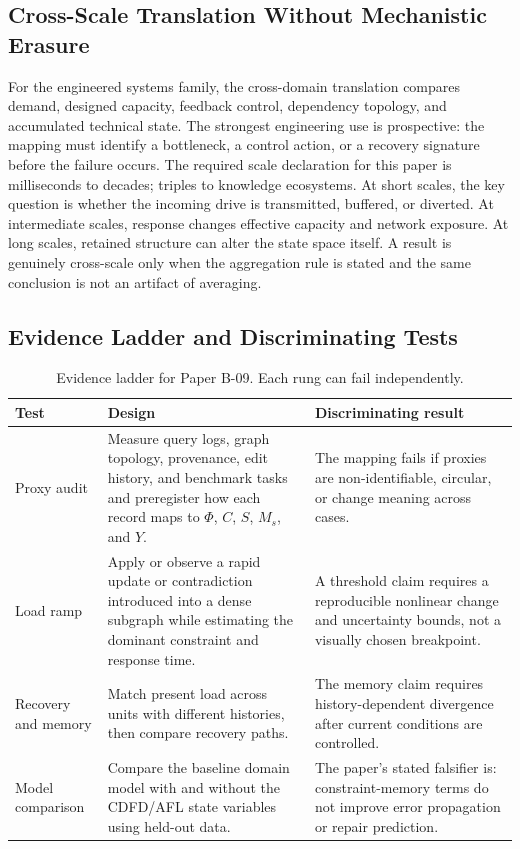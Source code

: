 \documentclass[11pt,a4paper]{article}
\begin{document}
\subsection{Cross-Scale Translation Without Mechanistic Erasure}

For the engineered systems family, the cross-domain translation compares demand, designed capacity, feedback control, dependency topology, and accumulated technical state. The strongest engineering use is prospective: the mapping must identify a bottleneck, a control action, or a recovery signature before the failure occurs. \cite{BarabasiAlbert1999,WattsStrogatz1998,Shannon1948,BakTangWiesenfeld1987}
The required scale declaration for this paper is milliseconds to decades; triples to knowledge ecosystems. At short
scales, the key question is whether the incoming drive is transmitted,
buffered, or diverted. At intermediate scales, response changes effective
capacity and network exposure. At long scales, retained structure can alter the
state space itself. A result is genuinely cross-scale only when the aggregation
rule is stated and the same conclusion is not an artifact of averaging.

\subsection{Evidence Ladder and Discriminating Tests}

\begin{table}[htbp]
\centering
\small
\caption{Evidence ladder for Paper B-09. Each rung can fail independently.}
\begin{tabularx}{\textwidth}{|p{}|X|X|}
\hline
\textbf{Test} & \textbf{Design} & \textbf{Discriminating result} \\
\hline
Proxy audit & Measure query logs, graph topology, provenance, edit history, and benchmark tasks and preregister how each record maps to $\Phi$, $C$, $S$, $M_s$, and $Y$. & The mapping fails if proxies are non-identifiable, circular, or change meaning across cases. \\
\hline
Load ramp & Apply or observe a rapid update or contradiction introduced into a dense subgraph while estimating the dominant constraint and response time. & A threshold claim requires a reproducible nonlinear change and uncertainty bounds, not a visually chosen breakpoint. \\
\hline
Recovery and memory & Match present load across units with different histories, then compare recovery paths. & The memory claim requires history-dependent divergence after current conditions are controlled. \\
\hline
Model comparison & Compare the baseline domain model with and without the CDFD/AFL state variables using held-out data. & The paper's stated falsifier is: constraint-memory terms do not improve error propagation or repair prediction. \\
\hline
\end{tabularx}
\end{table}
\end{document}
